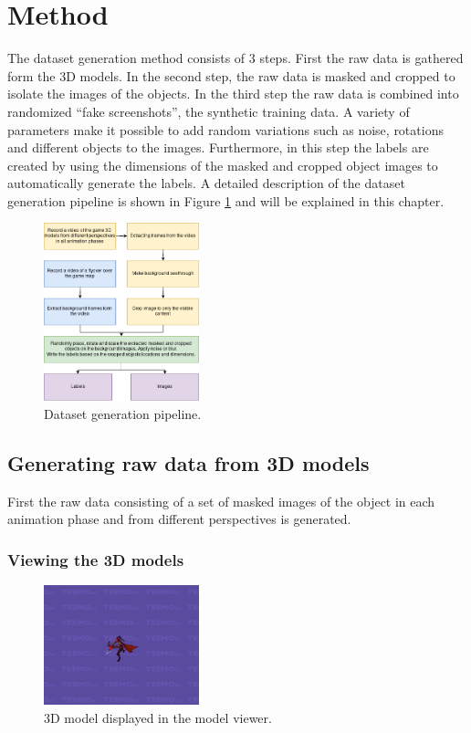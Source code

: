 \section{Method}
The dataset generation method consists of 3 steps.
First the raw data is gathered form the 3D models.
In the second step, the raw data is masked and cropped to isolate the images of the objects.
In the third step the raw data is combined into randomized ``fake screenshots'', the synthetic training data.
A variety of parameters make it possible to add random variations such as noise, rotations and different objects to the images.
Furthermore, in this step the labels are created by using the dimensions of the masked and cropped object images to automatically generate the labels.
A detailed description of the dataset generation pipeline is shown in Figure \ref{fig:dataset_generation} and will be explained in this chapter.

\begin{figure}[t]
\centering
\includegraphics[width=0.4\textwidth]{figures/dataset_generation.png}
\caption{Dataset generation pipeline.}
\label{fig:dataset_generation}
\end{figure}

\subsection{Generating raw data from 3D models}
First the raw data consisting of a set of masked images of the object in each animation phase and from different perspectives is generated.
\subsubsection{Viewing the 3D models}

\begin{figure}[t]
\centering
\includegraphics[width=0.4\textwidth]{figures/modelviewer.jpg}
\caption{3D model displayed in the model viewer.}
\label{fig:mv}
\end{figure}

